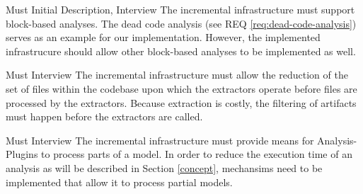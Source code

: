 \documentclass[a4paper]{article}
\begin{document}
\begin{req}\label{req:analysis-types}
	\reqtable
	{Must}  {Initial Description, Interview}
	{The incremental infrastructure must support block-based analyses. }
	{The dead code analysis (see REQ \ref{req:dead-code-analysis}) serves as an example for our implementation. However, the implemented infrastrucure should allow other block-based analyses to be implemented as well.}
\end{req}


\begin{req} \label{req:early-filtering}
\reqtable
	{Must}  {Interview}
	{The incremental infrastructure must allow the reduction of the set of files within the codebase upon which the extractors operate before files are processed by the extractors.}
	{Because extraction is costly, the filtering of artifacts must happen before the extractors are called.}
\end{req}

\begin{req} \label{req:partial-models}
\reqtable
	{Must}  {Interview}
	{The incremental infrastructure must provide means for Analysis-Plugins to process parts of a model.}
	{In order to reduce the execution time of an analysis as will be described in Section \ref{concept}, mechansims need to be implemented that allow it to process partial models.}
\end{req}


\clearpage
\end{document}

